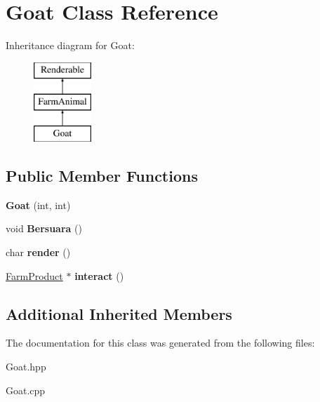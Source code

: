 \hypertarget{class_goat}{}\section{Goat Class Reference}
\label{class_goat}
Inheritance diagram for Goat\+:\begin{figure}[H]
\begin{center}
\leavevmode
\includegraphics[height=3.000000cm]{class_goat}
\end{center}
\end{figure}
\subsection*{Public Member Functions}
\begin{DoxyCompactItemize}
\item 
\mbox{\label{class_goat_a4523e314d43554c27643a9074cad01f2}} 
{\bfseries Goat} (int, int)
\item 
\mbox{\label{class_goat_a2ebf3333105a2e02a2f66821c03f916b}} 
void {\bfseries Bersuara} ()
\item 
\mbox{\label{class_goat_a04e3c2f2247555b701daf99b4417ca6e}} 
char {\bfseries render} ()
\item 
\mbox{\label{class_goat_a7519ea4de93611f66e952126d6bd8d6e}} 
\mbox{\hyperlink{class_farm_product}{Farm\+Product}} $\ast$ {\bfseries interact} ()
\end{DoxyCompactItemize}
\subsection*{Additional Inherited Members}


The documentation for this class was generated from the following files\+:\begin{DoxyCompactItemize}
\item 
Goat.\+hpp\item 
Goat.\+cpp\end{DoxyCompactItemize}
